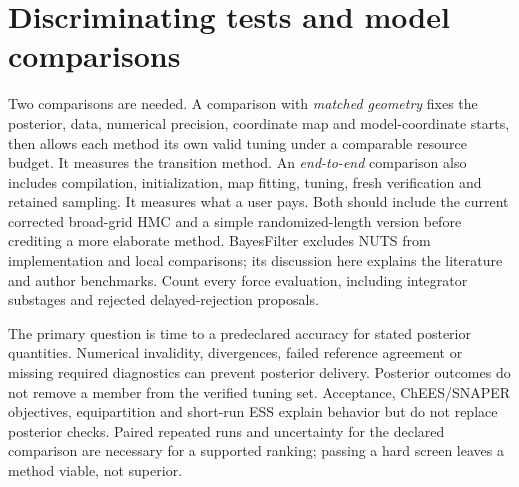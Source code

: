 \section{Discriminating tests and model comparisons}
\label{sec:bf-modern-tests}

Two comparisons are needed. A comparison with \emph{matched geometry} fixes the
posterior, data, numerical precision, coordinate map and model-coordinate
starts, then allows each method its own valid tuning under a comparable
resource budget. It measures the transition method. An \emph{end-to-end}
comparison also includes compilation, initialization, map fitting, tuning,
fresh verification and retained sampling. It measures what a user pays.
Both should include the current corrected broad-grid HMC and a simple
randomized-length version before crediting a more elaborate method. BayesFilter
excludes NUTS from implementation and local comparisons; its discussion here
explains the literature and author benchmarks. Count every force evaluation, including integrator
substages and rejected delayed-rejection proposals.

The primary question is time to a predeclared accuracy for stated posterior
quantities. Numerical invalidity, divergences, failed reference agreement or
missing required diagnostics can prevent posterior delivery. Posterior
outcomes do not remove a member from the verified tuning set. Acceptance, ChEES/SNAPER
objectives, equipartition and short-run ESS explain behavior but do not
replace posterior checks. Paired repeated runs and uncertainty for the
declared comparison are necessary for a supported ranking; passing a hard
screen leaves a method viable, not superior.


